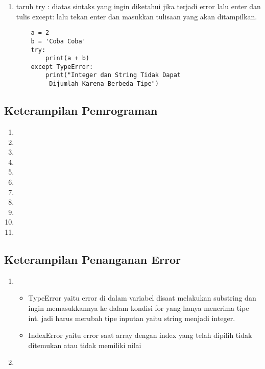 \begin{enumerate}
	\item taruh try : diatas sintaks yang ingin diketahui jika terjadi error lalu enter dan tulis except: lalu tekan enter 
dan masukkan tulisaan yang akan ditampilkan.
	\begin{verbatim}
	a = 2
	b = 'Coba Coba'
	try:
    	print(a + b)
	except TypeError:
    	print("Integer dan String Tidak Dapat
    	 Dijumlah Karena Berbeda Tipe")
	\end{verbatim}

\end{enumerate}
\subsection{Keterampilan Pemrograman}
\begin{enumerate}
	\item 

	\item 

	\item 

	\item 

	\item 

	\item 

	\item 

	\item 

	\item 

	\item 
	
	\item 
\end{enumerate}
\subsection{Keterampilan Penanganan Error}
\begin{enumerate}
	\item \begin{itemize} 
		\item TypeError yaitu error di dalam variabel disaat melakukan substring dan ingin memasukkannya ke dalam kondisi for 
	yang hanya menerima tipe int. jadi harus merubah tipe inputan yaitu string menjadi integer.
		\item IndexError yaitu error saat array dengan index yang telah dipilih tidak ditemukan atau tidak memiliki nilai
		\end{itemize}

	\item 
\end{enumerate}

